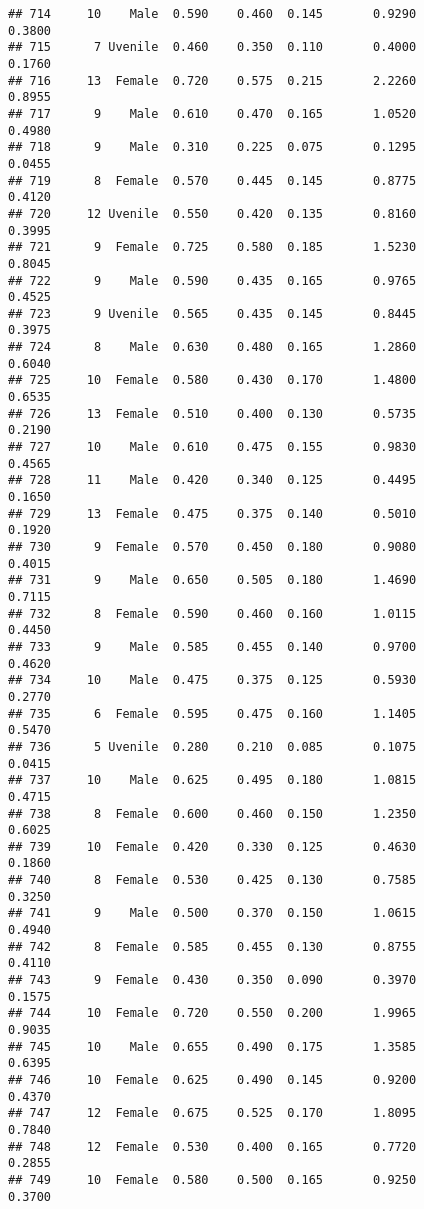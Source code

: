 \documentclass[
]{article}
\begin{document}
\begin{verbatim}
## 714     10    Male  0.590    0.460  0.145       0.9290         0.3800
## 715      7 Uvenile  0.460    0.350  0.110       0.4000         0.1760
## 716     13  Female  0.720    0.575  0.215       2.2260         0.8955
## 717      9    Male  0.610    0.470  0.165       1.0520         0.4980
## 718      9    Male  0.310    0.225  0.075       0.1295         0.0455
## 719      8  Female  0.570    0.445  0.145       0.8775         0.4120
## 720     12 Uvenile  0.550    0.420  0.135       0.8160         0.3995
## 721      9  Female  0.725    0.580  0.185       1.5230         0.8045
## 722      9    Male  0.590    0.435  0.165       0.9765         0.4525
## 723      9 Uvenile  0.565    0.435  0.145       0.8445         0.3975
## 724      8    Male  0.630    0.480  0.165       1.2860         0.6040
## 725     10  Female  0.580    0.430  0.170       1.4800         0.6535
## 726     13  Female  0.510    0.400  0.130       0.5735         0.2190
## 727     10    Male  0.610    0.475  0.155       0.9830         0.4565
## 728     11    Male  0.420    0.340  0.125       0.4495         0.1650
## 729     13  Female  0.475    0.375  0.140       0.5010         0.1920
## 730      9  Female  0.570    0.450  0.180       0.9080         0.4015
## 731      9    Male  0.650    0.505  0.180       1.4690         0.7115
## 732      8  Female  0.590    0.460  0.160       1.0115         0.4450
## 733      9    Male  0.585    0.455  0.140       0.9700         0.4620
## 734     10    Male  0.475    0.375  0.125       0.5930         0.2770
## 735      6  Female  0.595    0.475  0.160       1.1405         0.5470
## 736      5 Uvenile  0.280    0.210  0.085       0.1075         0.0415
## 737     10    Male  0.625    0.495  0.180       1.0815         0.4715
## 738      8  Female  0.600    0.460  0.150       1.2350         0.6025
## 739     10  Female  0.420    0.330  0.125       0.4630         0.1860
## 740      8  Female  0.530    0.425  0.130       0.7585         0.3250
## 741      9    Male  0.500    0.370  0.150       1.0615         0.4940
## 742      8  Female  0.585    0.455  0.130       0.8755         0.4110
## 743      9  Female  0.430    0.350  0.090       0.3970         0.1575
## 744     10  Female  0.720    0.550  0.200       1.9965         0.9035
## 745     10    Male  0.655    0.490  0.175       1.3585         0.6395
## 746     10  Female  0.625    0.490  0.145       0.9200         0.4370
## 747     12  Female  0.675    0.525  0.170       1.8095         0.7840
## 748     12  Female  0.530    0.400  0.165       0.7720         0.2855
## 749     10  Female  0.580    0.500  0.165       0.9250         0.3700

\end{verbatim}
\end{document}
